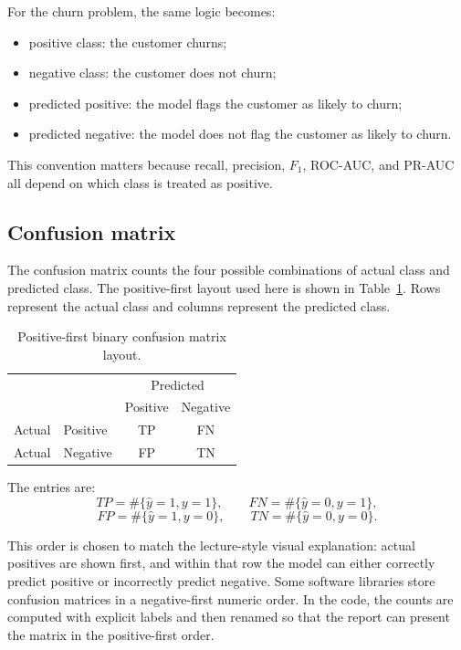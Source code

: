 For the churn problem, the same logic becomes:
\begin{itemize}
    \item positive class: the customer churns;
    \item negative class: the customer does not churn;
    \item predicted positive: the model flags the customer as likely to churn;
    \item predicted negative: the model does not flag the customer as likely to churn.
\end{itemize}

This convention matters because recall, precision, \(F_1\), ROC-AUC, and PR-AUC all depend on which class is treated as positive.

\subsection{Confusion matrix}

The confusion matrix counts the four possible combinations of actual class and predicted class. The positive-first layout used here is shown in Table~\ref{tab:stage04-generic-confusion-matrix}. Rows represent the actual class and columns represent the predicted class.

\begin{table}[H]
\centering
\caption{Positive-first binary confusion matrix layout.}
\label{tab:stage04-generic-confusion-matrix}
\begin{tabular}{llcc}
\toprule
 & & \multicolumn{2}{c}{Predicted} \\
 & & Positive & Negative \\
\midrule
Actual & Positive & TP & FN \\
Actual & Negative & FP & TN \\
\bottomrule
\end{tabular}
\end{table}

The entries are:
\[
TP = \#\{\hat{y}=1, y=1\},
\qquad
FN = \#\{\hat{y}=0, y=1\},
\]
\[
FP = \#\{\hat{y}=1, y=0\},
\qquad
TN = \#\{\hat{y}=0, y=0\}.
\]

This order is chosen to match the lecture-style visual explanation: actual positives are shown first, and within that row the model can either correctly predict positive or incorrectly predict negative. Some software libraries store confusion matrices in a negative-first numeric order. In the code, the counts are computed with explicit labels and then renamed so that the report can present the matrix in the positive-first order.

